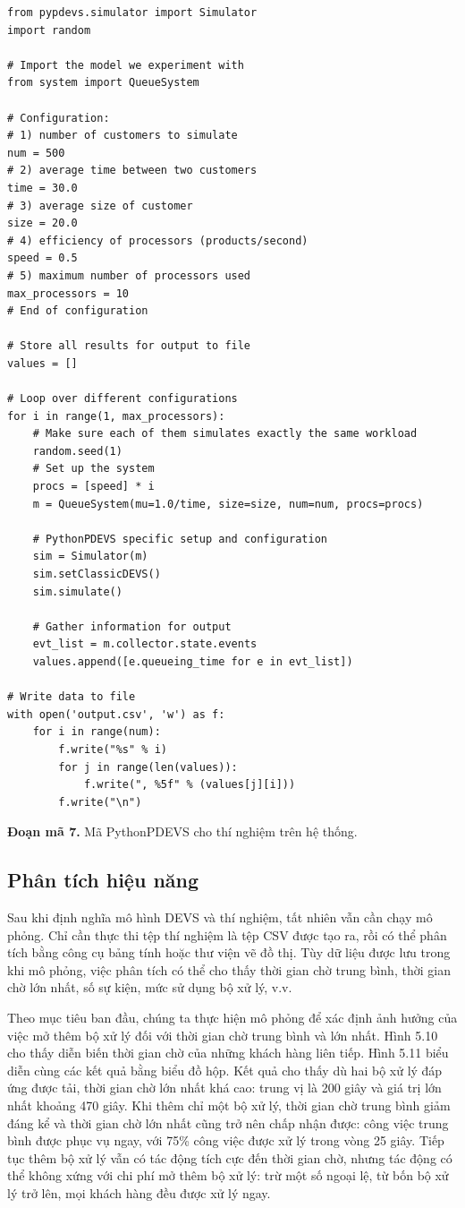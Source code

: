 \begin{verbatim}
from pypdevs.simulator import Simulator
import random

# Import the model we experiment with
from system import QueueSystem

# Configuration:
# 1) number of customers to simulate
num = 500
# 2) average time between two customers
time = 30.0
# 3) average size of customer
size = 20.0
# 4) efficiency of processors (products/second)
speed = 0.5
# 5) maximum number of processors used
max_processors = 10
# End of configuration

# Store all results for output to file
values = []

# Loop over different configurations
for i in range(1, max_processors):
    # Make sure each of them simulates exactly the same workload
    random.seed(1)
    # Set up the system
    procs = [speed] * i
    m = QueueSystem(mu=1.0/time, size=size, num=num, procs=procs)

    # PythonPDEVS specific setup and configuration
    sim = Simulator(m)
    sim.setClassicDEVS()
    sim.simulate()

    # Gather information for output
    evt_list = m.collector.state.events
    values.append([e.queueing_time for e in evt_list])

# Write data to file
with open('output.csv', 'w') as f:
    for i in range(num):
        f.write("%s" % i)
        for j in range(len(values)):
            f.write(", %5f" % (values[j][i]))
        f.write("\n")
\end{verbatim}
\noindent\textbf{Đoạn mã 7.} Mã PythonPDEVS cho thí nghiệm trên hệ thống.

\subsection{Phân tích hiệu năng}
Sau khi định nghĩa mô hình DEVS và thí nghiệm, tất nhiên vẫn cần chạy mô phỏng. Chỉ cần thực thi tệp thí nghiệm là tệp CSV được tạo ra, rồi có thể phân tích bằng công cụ bảng tính hoặc thư viện vẽ đồ thị. Tùy dữ liệu được lưu trong khi mô phỏng, việc phân tích có thể cho thấy thời gian chờ trung bình, thời gian chờ lớn nhất, số sự kiện, mức sử dụng bộ xử lý, v.v.

Theo mục tiêu ban đầu, chúng ta thực hiện mô phỏng để xác định ảnh hưởng của việc mở thêm bộ xử lý đối với thời gian chờ trung bình và lớn nhất. Hình 5.10 cho thấy diễn biến thời gian chờ của những khách hàng liên tiếp. Hình 5.11 biểu diễn cùng các kết quả bằng biểu đồ hộp. Kết quả cho thấy dù hai bộ xử lý đáp ứng được tải, thời gian chờ lớn nhất khá cao: trung vị là 200 giây và giá trị lớn nhất khoảng 470 giây. Khi thêm chỉ một bộ xử lý, thời gian chờ trung bình giảm đáng kể và thời gian chờ lớn nhất cũng trở nên chấp nhận được: công việc trung bình được phục vụ ngay, với 75\% công việc được xử lý trong vòng 25 giây. Tiếp tục thêm bộ xử lý vẫn có tác động tích cực đến thời gian chờ, nhưng tác động có thể không xứng với chi phí mở thêm bộ xử lý: trừ một số ngoại lệ, từ bốn bộ xử lý trở lên, mọi khách hàng đều được xử lý ngay.

